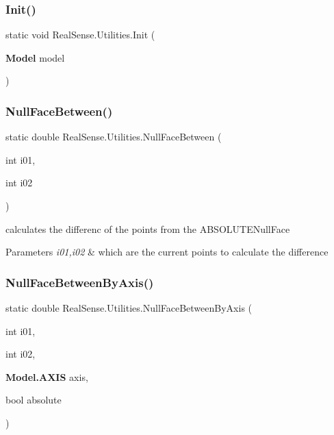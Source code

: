 \subsubsection{Init()}
{\footnotesize\ttfamily static void Real\+Sense.\+Utilities.\+Init (\begin{DoxyParamCaption}\item[{\textbf{ Model}}]{model }\end{DoxyParamCaption})\hspace{0.3cm}{\ttfamily [static]}}

\mbox{\label{class_real_sense_1_1_utilities_a7a94b87d3f23a88d4bddeb6307073b0e}} 
\subsubsection{Null\+Face\+Between()}
{\footnotesize\ttfamily static double Real\+Sense.\+Utilities.\+Null\+Face\+Between (\begin{DoxyParamCaption}\item[{int}]{i01,  }\item[{int}]{i02 }\end{DoxyParamCaption})\hspace{0.3cm}{\ttfamily [static]}}

calculates the differenc of the points from the A\+B\+S\+O\+L\+U\+T\+E\+Null\+Face 
\begin{DoxyParams}{Parameters}
{\em i01,i02} & which are the current points to calculate the difference \\
\hline
\end{DoxyParams}
\mbox{\label{class_real_sense_1_1_utilities_a4b9b7b1afb00bad3ced945c757aaf711}} 
\subsubsection{Null\+Face\+Between\+By\+Axis()}
{\footnotesize\ttfamily static double Real\+Sense.\+Utilities.\+Null\+Face\+Between\+By\+Axis (\begin{DoxyParamCaption}\item[{int}]{i01,  }\item[{int}]{i02,  }\item[{\textbf{ Model.\+A\+X\+IS}}]{axis,  }\item[{bool}]{absolute }\end{DoxyParamCaption})\hspace{0.3cm}{\ttfamily [static]}}

